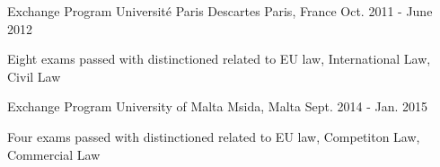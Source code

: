 \begin{cventries}
    \cventry
    {Exchange Program} %
    {Université Paris Descartes} %
    {Paris, France} %
    {Oct. 2011 - June 2012} %
    {
    \begin{cvitems} %
\item {Eight exams passed with distinctioned related to EU law, International Law, Civil Law}
      \end{cvitems}
    }
    
    \cventry
    {Exchange Program} %
    {University of Malta} %
    {Msida, Malta} %
    {Sept. 2014 - Jan. 2015} %
    {
     \begin{cvitems} %
\item {Four exams passed with distinctioned related to EU law, Competiton Law, Commercial Law}
      \end{cvitems}
    }

\end{cventries}

